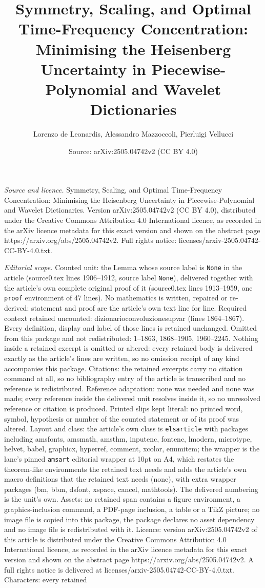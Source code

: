 \documentclass[10pt,a4paper]{amsart}
\title[Symmetry, Scaling, and Optimal Time-Frequency Concentration:]{Symmetry, Scaling, and Optimal Time-Frequency Concentration: Minimising the Heisenberg Uncertainty in Piecewise-Polynomial and Wavelet Dictionaries}
\author{Lorenzo de Leonardis, Alessandro Mazzoccoli, Pierluigi Vellucci}
\date{Source: arXiv:2505.04742v2 (CC BY 4.0)}
\begin{document}
\maketitle

\noindent\emph{Source and licence.} Symmetry, Scaling, and Optimal Time-Frequency Concentration: Minimising the Heisenberg Uncertainty in Piecewise-Polynomial and Wavelet Dictionaries. Version arXiv:2505.04742v2 (CC BY 4.0), distributed under the Creative Commons Attribution 4.0 International licence, as recorded in the arXiv licence metadata for this exact version and shown on the abstract page https://arxiv.org/abs/2505.04742v2. Full rights notice: licenses/arxiv-2505.04742-CC-BY-4.0.txt.\par\smallskip

\noindent\textit{Editorial scope.} Counted unit: the Lemma whose source label is \texttt{None} in the article (source0.tex lines 1906--1912, source label \texttt{None}), delivered together with the article's own complete original proof of it (source0.tex lines 1913--1959, one \texttt{proof} environment of 47 lines). No mathematics is written, repaired or re-derived: statement and proof are the article's own text line for line. Required context retained uncounted: dizionarioconvoluzionesupvar (lines 1864--1867). Every definition, display and label of those lines is retained unchanged. Omitted from this package and not redistributed: 1--1863, 1868--1905, 1960--2245. Nothing inside a retained excerpt is omitted or altered: every retained body is delivered exactly as the article's lines are written, so no omission receipt of any kind accompanies this package. Citations: the retained excerpts carry no citation command at all, so no bibliography entry of the article is transcribed and no reference is redistributed. Reference adaptation: none was needed and none was made; every reference inside the delivered unit resolves inside it, so no unresolved reference or citation is produced. Printed slips kept literal: no printed word, symbol, hypothesis or number of the counted statement or of its proof was altered. Layout and class: the article's own class is \texttt{elsarticle} with packages including amsfonts, amsmath, amsthm, inputenc, fontenc, lmodern, microtype, helvet, babel, graphicx, hyperref, comment, xcolor, enumitem; the wrapper is the lane's pinned \texttt{amsart} editorial wrapper at 10pt on A4, which restates the theorem-like environments the retained text needs and adds the article's own macro definitions that the retained text needs (none), with extra wrapper packages (bm, bbm, dsfont, xspace, cancel, mathtools). The delivered numbering is the unit's own. Assets: no retained span contains a figure environment, a graphics-inclusion command, a PDF-page inclusion, a table or a TikZ picture; no image file is copied into this package, the package declares no asset dependency and no image file is redistributed with it. Licence: version arXiv:2505.04742v2 of this article is distributed under the Creative Commons Attribution 4.0 International licence, as recorded in the arXiv licence metadata for this exact version and shown on the abstract page https://arxiv.org/abs/2505.04742v2. A full rights notice is delivered at licenses/arxiv-2505.04742-CC-BY-4.0.txt. Characters: every retained 
\end{document}
